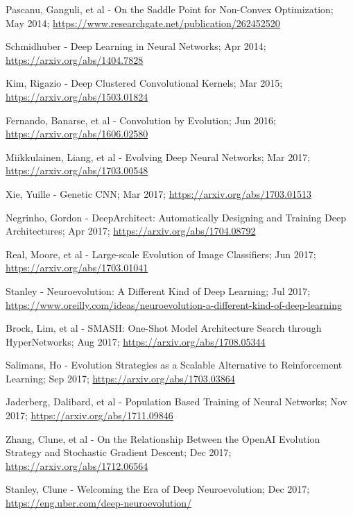 \documentclass[journal, a4paper]{IEEEtran}
\begin{document}
\begin{thebibliography}{5}
    Pascanu, Ganguli, et al - On the Saddle Point for Non-Convex Optimization; May 2014;
    \url{https://www.researchgate.net/publication/262452520}

    Schmidhuber - Deep Learning in Neural Networks; Apr 2014;
    \url{https://arxiv.org/abs/1404.7828}

    Kim, Rigazio - Deep Clustered Convolutional Kernels; Mar 2015;
    \url{https://arxiv.org/abs/1503.01824}

    Fernando, Banarse, et al - Convolution by Evolution; Jun 2016;
    \url{https://arxiv.org/abs/1606.02580}

    Miikkulainen, Liang, et al - Evolving Deep Neural Networks; Mar 2017;
    \url{https://arxiv.org/abs/1703.00548}

    Xie, Yuille - Genetic CNN; Mar 2017;
    \url{https://arxiv.org/abs/1703.01513}

    Negrinho, Gordon - DeepArchitect: Automatically Designing and Training Deep Architectures; Apr 2017;
    \url{https://arxiv.org/abs/1704.08792}

    Real, Moore, et al - Large-scale Evolution of Image Classifiers; Jun 2017;
    \url{https://arxiv.org/abs/1703.01041}

    Stanley - Neuroevolution: A Different Kind of Deep Learning; Jul 2017;
    \url{https://www.oreilly.com/ideas/neuroevolution-a-different-kind-of-deep-learning}

    Brock, Lim, et al - SMASH: One-Shot Model Architecture Search through HyperNetworks; Aug 2017;
    \url{https://arxiv.org/abs/1708.05344}

    Salimans, Ho - Evolution Strategies as a Scalable Alternative to Reinforcement Learning; Sep 2017;
    \url{https://arxiv.org/abs/1703.03864}

    Jaderberg, Dalibard, et al - Population Based Training of Neural Networks; Nov 2017;
    \url{https://arxiv.org/abs/1711.09846}

    Zhang, Clune, et al - On the Relationship Between the OpenAI Evolution Strategy and Stochastic Gradient Descent; Dec 2017;
    \url{https://arxiv.org/abs/1712.06564}

    Stanley, Clune - Welcoming the Era of Deep Neuroevolution; Dec 2017;
    \url{https://eng.uber.com/deep-neuroevolution/}


\end{thebibliography}
\end{document}
